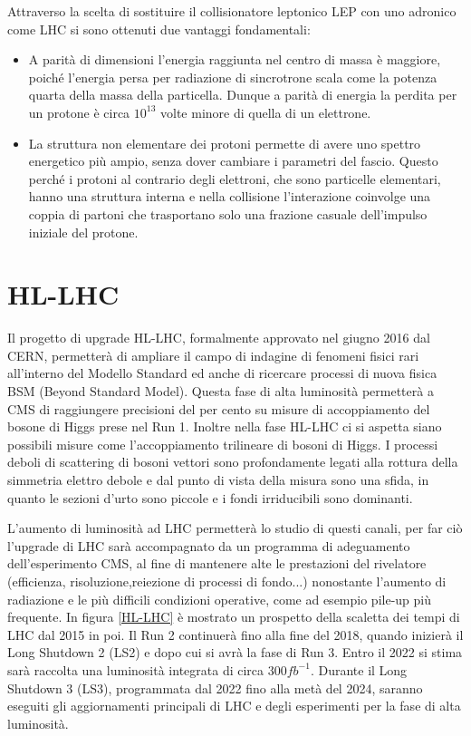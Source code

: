 Attraverso la scelta di sostituire il collisionatore leptonico LEP con uno adronico
come LHC si sono ottenuti due vantaggi fondamentali: 
\begin{itemize}
\item A parità di dimensioni l'energia raggiunta nel centro di massa è maggiore, poiché l'energia persa per radiazione di sincrotrone scala come la potenza quarta della massa della particella. Dunque a parità di energia la perdita per un protone è circa $10^{13}$ volte minore di quella di un elettrone.

\item La struttura non elementare dei protoni permette di avere uno spettro energetico più ampio, senza dover cambiare i parametri del fascio. Questo perché i protoni al contrario degli elettroni, che sono particelle elementari, hanno una struttura interna e nella collisione l'interazione coinvolge una coppia di partoni che trasportano solo una frazione  casuale dell'impulso iniziale del protone.
\end{itemize}

\section{HL-LHC}
Il progetto di upgrade HL-LHC, formalmente approvato nel giugno 2016 dal CERN, permetterà di ampliare il campo di indagine di fenomeni fisici rari all'interno del Modello Standard ed anche di ricercare processi di nuova fisica BSM (Beyond Standard Model). Questa fase di alta luminosità permetterà a CMS di raggiungere precisioni del per cento su misure di accoppiamento del bosone di Higgs prese nel Run 1. Inoltre nella fase HL-LHC ci si aspetta siano possibili misure come l'accoppiamento trilineare di bosoni di Higgs. 
I processi deboli di scattering di bosoni vettori sono profondamente legati alla rottura della simmetria elettro debole e dal punto di vista della misura sono una sfida, in quanto le sezioni d'urto sono piccole e i fondi irriducibili sono dominanti. 

L'aumento di luminosità ad LHC permetterà lo studio di questi canali, per far ciò  l'upgrade di LHC sarà accompagnato da un programma di adeguamento dell'esperimento CMS, al fine di mantenere alte le prestazioni del rivelatore (efficienza, risoluzione,reiezione di processi di fondo...) nonostante l'aumento di radiazione e le più difficili condizioni operative, come ad esempio pile-up più frequente.
In figura \ref{HL-LHC} è mostrato un prospetto della scaletta dei tempi di LHC dal 2015 in poi. Il Run 2 continuerà fino alla fine del 2018, quando inizierà il Long Shutdown 2 (LS2) e dopo cui si avrà la fase di Run 3.  Entro il 2022 si stima sarà raccolta una luminosità integrata di circa $300 fb^{-1}$. 
Durante il Long Shutdown 3 (LS3), programmata dal 2022 fino alla metà del 2024, saranno eseguiti gli aggiornamenti principali di LHC e degli esperimenti per la fase di alta luminosità.

